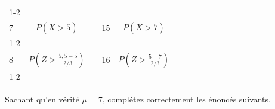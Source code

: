 \begin{questions}
\begin{center}
\begin{tabular}{|l|c|c|l|c|}
	 \\[4mm]
	 \cline{1-2}\cline{4-5}
	 &&&&\\[-3mm]
	  7 & $\displaystyle P\left( \overline{X} > 5 \right)$
	 &  &
	  15 & $\displaystyle P\left( \overline{X} > 7 \right)$
	 \\[4mm]
	 \cline{1-2}\cline{4-5}
	 &&&&\\[-3mm]
	  8 & $\displaystyle P\left( Z > \frac{5,5-5}{2/3} \right)$
	  &  &
	   16 & $\displaystyle P\left( Z > \frac{5-7}{2/3} \right)$
	  \\[4mm]
	  \cline{1-2}\cline{4-5}
\end{tabular}
\end{center}

\medskip\medskip\medskip\medskip


Sachant qu'en vérité $\mu = 7$, complétez correctement les énoncés suivants.

\medskip\medskip

\end{questions}
